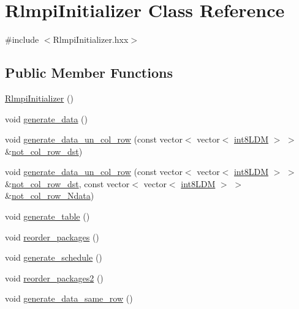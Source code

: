 \hypertarget{classRlmpiInitializer}{
\section{RlmpiInitializer Class Reference}
\label{classRlmpiInitializer}
}


{\ttfamily \#include $<$RlmpiInitializer.hxx$>$}\subsection*{Public Member Functions}
\begin{DoxyCompactItemize}
\item 
\hyperlink{classRlmpiInitializer_a658d6a4ceeadcc2101eea81790fe02a9}{RlmpiInitializer} ()
\item 
void \hyperlink{classRlmpiInitializer_ab93e99398a7d1ef2a21748260945d0ef}{generate\_\-data} ()
\item 
void \hyperlink{classRlmpiInitializer_a1549a382ac60a778058b043a080526ce}{generate\_\-data\_\-un\_\-col\_\-row} (const vector$<$ vector$<$ \hyperlink{RlmpiSharedType_8h_a69782ffde89d45e86308f10afedf08a6}{int8LDM} $>$ $>$ \&\hyperlink{classRlmpiInitializer_a77a01156d9dc0028c4044c23bd28d41c}{not\_\-col\_\-row\_\-dst})
\item 
void \hyperlink{classRlmpiInitializer_aca84012e3fbab6b8b6b3d2d12e9aa0e8}{generate\_\-data\_\-un\_\-col\_\-row} (const vector$<$ vector$<$ \hyperlink{RlmpiSharedType_8h_a69782ffde89d45e86308f10afedf08a6}{int8LDM} $>$ $>$ \&\hyperlink{classRlmpiInitializer_a77a01156d9dc0028c4044c23bd28d41c}{not\_\-col\_\-row\_\-dst}, const vector$<$ vector$<$ \hyperlink{RlmpiSharedType_8h_a69782ffde89d45e86308f10afedf08a6}{int8LDM} $>$ $>$ \&\hyperlink{classRlmpiInitializer_a4e5488f2ff8a56a58dccd083ea13c6c4}{not\_\-col\_\-row\_\-Ndata})
\item 
void \hyperlink{classRlmpiInitializer_a74b0f63a73cf39fb85072aeb1580d562}{generate\_\-table} ()
\item 
void \hyperlink{classRlmpiInitializer_ac7c4c8c380121d76406d4c0d16c379e8}{reorder\_\-packages} ()
\item 
void \hyperlink{classRlmpiInitializer_a5136c465187a9aff22ebfe4f6dc4e971}{generate\_\-schedule} ()
\item 
void \hyperlink{classRlmpiInitializer_a47a7d1c01a628e42d996785f6e06c008}{reorder\_\-packages2} ()
\item 
void \hyperlink{classRlmpiInitializer_aea9d8bac987da51da34638506f1bb844}{generate\_\-data\_\-same\_\-row} ()

\end{DoxyCompactItemize}
